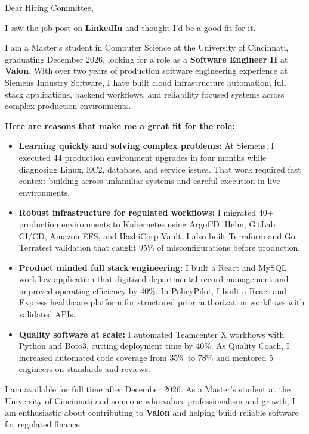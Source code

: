 \documentclass[11pt]{letter}
\date{}
\begin{document}
\begin{letter}{}

\opening{Dear Hiring Committee,}

I saw the job post on \textbf{LinkedIn} and thought I'd be a good fit for it.

I am a Master's student in Computer Science at the University of Cincinnati, graduating December 2026, looking for a role as a \textbf{Software Engineer II} at \textbf{Valon}. With over two years of production software engineering experience at Siemens Industry Software, I have built cloud infrastructure automation, full stack applications, backend workflows, and reliability focused systems across complex production environments.

\textbf{Here are reasons that make me a great fit for the role:}

\begin{itemize}[leftmargin=*, itemsep=0.35em]
    \item \textbf{Learning quickly and solving complex problems:} At Siemens, I executed 44 production environment upgrades in four months while diagnosing Linux, EC2, database, and service issues. That work required fast context building across unfamiliar systems and careful execution in live environments.

    \item \textbf{Robust infrastructure for regulated workflows:} I migrated 40+ production environments to Kubernetes using ArgoCD, Helm, GitLab CI/CD, Amazon EFS, and HashiCorp Vault. I also built Terraform and Go Terratest validation that caught 95\% of misconfigurations before production.

    \item \textbf{Product minded full stack engineering:} I built a React and MySQL workflow application that digitized departmental record management and improved operating efficiency by 40\%. In PolicyPilot, I built a React and Express healthcare platform for structured prior authorization workflows with validated APIs.

    \item \textbf{Quality software at scale:} I automated Teamcenter X workflows with Python and Boto3, cutting deployment time by 40\%. As Quality Coach, I increased automated code coverage from 35\% to 78\% and mentored 5 engineers on standards and reviews.
\end{itemize}

I am available for full time after December 2026. As a Master's student at the University of Cincinnati and someone who values professionalism and growth, I am enthusiastic about contributing to \textbf{Valon} and helping build reliable software for regulated finance.


\end{letter}
\end{document}
